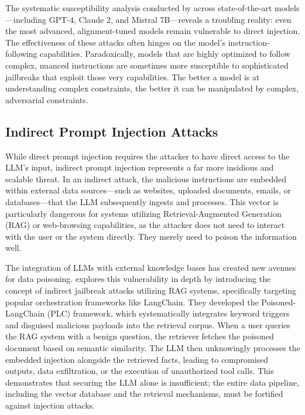 \documentclass[11pt,a4paper]{article}
\begin{document}
The systematic susceptibility analysis conducted by \cite{Pathade_2025_LLMs} across state-of-the-art models---including GPT-4, Claude 2, and Mistral 7B---reveals a troubling reality: even the most advanced, alignment-tuned models remain vulnerable to direct injection. The effectiveness of these attacks often hinges on the model's instruction-following capabilities. Paradoxically, models that are highly optimized to follow complex, nuanced instructions are sometimes more susceptible to sophisticated jailbreaks that exploit those very capabilities. The better a model is at understanding complex constraints, the better it can be manipulated by complex, adversarial constraints.

\subsection{Indirect Prompt Injection Attacks}
While direct prompt injection requires the attacker to have direct access to the LLM's input, indirect prompt injection represents a far more insidious and scalable threat. In an indirect attack, the malicious instructions are embedded within external data sources---such as websites, uploaded documents, emails, or databases---that the LLM subsequently ingests and processes. This vector is particularly dangerous for systems utilizing Retrieval-Augmented Generation (RAG) or web-browsing capabilities, as the attacker does not need to interact with the user or the system directly. They merely need to poison the information well.

The integration of LLMs with external knowledge bases has created new avenues for data poisoning. \cite{Wang_2024_LLMs} explores this vulnerability in depth by introducing the concept of indirect jailbreak attacks utilizing RAG systems, specifically targeting popular orchestration frameworks like LangChain. They developed the Poisoned-LangChain (PLC) framework, which systematically integrates keyword triggers and disguised malicious payloads into the retrieval corpus. When a user queries the RAG system with a benign question, the retriever fetches the poisoned document based on semantic similarity. The LLM then unknowingly processes the embedded injection alongside the retrieved facts, leading to compromised outputs, data exfiltration, or the execution of unauthorized tool calls. This demonstrates that securing the LLM alone is insufficient; the entire data pipeline, including the vector database and the retrieval mechanisms, must be fortified against injection attacks.
\end{document}
